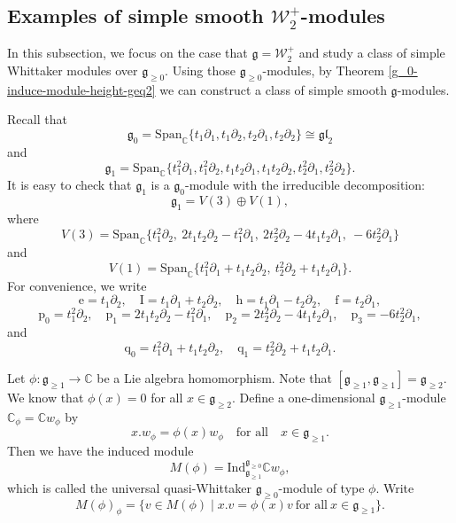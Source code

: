 \documentclass[12pt, a4paper]{amsart}
\newcommand{\fg}{\mathfrak g}
\newcommand{\C}{\mathbb{C}}
\newcommand{\rh}{\mathrm{h}}
\newcommand{\re}{\mathrm{e}}
\newcommand{\rf}{\mathrm{f}}
\newcommand{\ri}{\mathrm{I}}
\def\gl{\mathfrak{gl}}
\def\W{\mathcal{W}}
\theoremstyle{Theorem}
\theoremstyle{Theorem}
\numberwithin{equation}{section}
\begin{document}
\subsection{Examples of simple smooth $\W_{2}^{+}$-modules}
In this subsection, we focus on the case that $\fg=\W_{2}^{+}$ and
study a class of simple Whittaker modules over $\fg_{\geq0}$.
Using those $\fg_{\geq0}$-modules,
by Theorem \ref{g_0-induce-module-height-geq2} we can construct a class of simple smooth $\fg$-modules.

Recall that \[\fg_{0}=\text{Span}_{\C}\{t_{1}\partial_{1},t_{1}\partial_{2},t_{2}\partial_{1},t_{2}\partial_{2}\}\cong\gl_{2}\]
and
\[\fg_{1}=\text{Span}_{\C}\{t_{1}^{2}\partial_{1},t_{1}^{2}\partial_{2},t_{1}t_{2}\partial_{1},t_{1}t_{2}\partial_{2},
t_{2}^{2}\partial_{1},t_{2}^{2}\partial_{2}\}.\]
It is easy to check that $\fg_{1}$ is a $\fg_{0}$-module with the irreducible decomposition:
\[\fg_{1}=V(3)\oplus V(1),\]
where \[V(3)=\mathrm{Span}_{\C}\{t_{1}^{2}\partial_{2},\ 2t_{1}t_{2}\partial_{2}-t_{1}^{2}\partial_{1},\ 2t_{2}^{2}\partial_{2}-4t_{1}t_{2}\partial_{1},\ -6t_{2}^{2}\partial_{1}\}\] and
\[V(1)=\mathrm{Span}_{\C}\{t_{1}^{2}\partial_{1}+t_{1}t_{2}\partial_{2},\ t_{2}^{2}\partial_{2}+t_{1}t_{2}\partial_{1}\}.\]
For convenience, we write
\[\re=t_{1}\partial_{2},\quad \ri=t_{1}\partial_{1}+t_{2}\partial_{2},\quad \rh=t_{1}\partial_{1}-t_{2}\partial_{2},\quad \rf=t_{2}\partial_{1},\]
\[\mathrm{p}_{0}=t_{1}^{2}\partial_{2},\quad \mathrm{p}_{1}=2t_{1}t_{2}\partial_{2}-t_{1}^{2}\partial_{1},\quad 
\mathrm{p}_{2}=2t_{2}^{2}\partial_{2}-4t_{1}t_{2}\partial_{1},\quad \mathrm{p}_{3}=-6t_{2}^{2}\partial_{1},\]
and
\[\mathrm{q}_{0}=t_{1}^{2}\partial_{1}+t_{1}t_{2}\partial_{2},\quad \mathrm{q}_{1}=t_{2}^{2}\partial_{2}+t_{1}t_{2}\partial_{1}.\]

Let $\phi:\fg_{\geq1}\rightarrow\C$ be a Lie algebra homomorphism. Note that $[\fg_{\geq1},\fg_{\geq1}]=\fg_{\geq2}$. We know that $\phi(x)=0$ for all $x\in\fg_{\geq2}$.
Define a one-dimensional $\fg_{\geq1}$-module $\C_{\phi}=\C w_{\phi}$ by
\[x.w_{\phi}=\phi(x)w_{\phi}\quad\text{for all}\quad x\in\fg_{\geq1}.\]
Then we have the induced module
\[M(\phi)=\text{Ind}_{\fg_{\geq1}}^{\fg_{\geq0}}\C w_{\phi},\]
which is called the universal quasi-Whittaker $\fg_{\geq0}$-module of type $\phi$. 
Write 
\[M(\phi)_{\phi}=\{v\in M(\phi)\mid x.v=\phi(x)v\ \text{for all}\ x\in\fg_{\geq1}\}.\]
\end{document}
